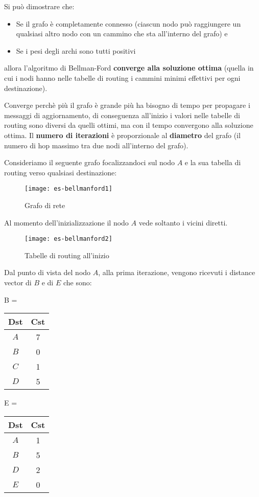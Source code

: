 \documentclass[a4paper]{article}
\begin{document}
\begin{itemize}
  \vspace{1em}
  \noindent
  Si può dimostrare che:
  \begin{itemize}
    \item Se il grafo è completamente connesso (ciascun nodo può raggiungere un qualsiasi
      altro nodo con un cammino che sta all'interno del grafo) e
    \item Se i pesi degli archi sono tutti positivi
  \end{itemize}
  allora l'algoritmo di Bellman-Ford \textbf{converge alla soluzione ottima} (quella in cui
  i nodi hanno nelle tabelle di routing i cammini minimi effettivi per ogni destinazione).

  Converge perchè più il grafo è grande più ha bisogno di tempo per propagare i messaggi
  di aggiornamento, di conseguenza all'inizio i valori nelle tabelle di routing sono
  diversi da quelli ottimi, ma con il tempo convergono alla soluzione ottima.
  Il \textbf{numero di iterazioni} è proporzionale al \textbf{diametro} del grafo (il
  numero di hop massimo tra due nodi all'interno del grafo).
  
  \begin{example}
    Consideriamo il seguente grafo focalizzandoci sul nodo \( A \) e la sua tabella di
    routing verso qualsiasi destinazione:
    \begin{figure}[H]
      \centering
      \texttt{[image: es-bellmanford1]}
      \caption{Grafo di rete}
    \end{figure}

    \noindent
    Al momento dell'inizializzazione il nodo \( A \) vede soltanto i vicini diretti.
    \begin{figure}[H]
      \centering
      \texttt{[image: es-bellmanford2]}
      \caption{Tabelle di routing all'inizio}
    \end{figure}

    \noindent
    Dal punto di vista del nodo \( A \), alla prima iterazione, vengono ricevuti
    i distance vector di \( B \) e di \( E \) che sono:
    \begin{table}[H]
      \centering
      B =
      \begin{tabular}{c|c}
        \textbf{Dst} & \textbf{Cst} \\
        \hline
        \( A \) & 7 \\
        \( B \) & 0 \\
        \( C \) & 1 \\
        \( D \) & 5 \\
      \end{tabular}
      \quad
      E =
      \begin{tabular}{c|c}
        \textbf{Dst} & \textbf{Cst} \\
        \hline
        \( A \) & 1 \\
        \( B \) & 5 \\
        \( D \) & 2 \\
        \( E \) & 0 \\
      \end{tabular}
    \end{table}


\end{example}
\end{itemize}
\end{document}
